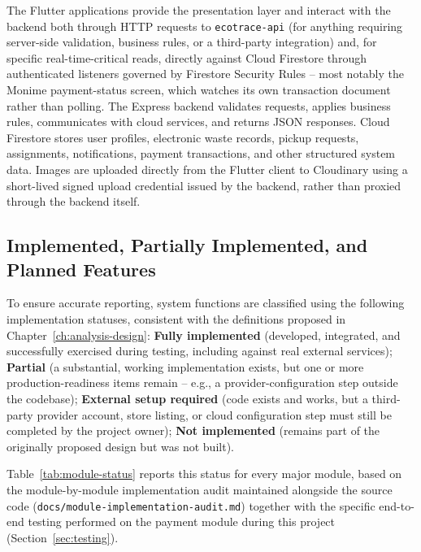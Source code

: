 The Flutter applications provide the presentation layer and interact with
the backend both through HTTP requests to \texttt{ecotrace-api} (for
anything requiring server-side validation, business rules, or a third-party
integration) and, for specific real-time-critical reads, directly against Cloud
Firestore through authenticated listeners governed by Firestore Security
Rules -- most notably the Monime payment-status screen, which watches its
own transaction document rather than polling. The Express backend validates
requests, applies business rules, communicates with cloud services, and
returns JSON responses. Cloud Firestore stores user profiles, electronic waste
records, pickup requests, assignments, notifications, payment transactions,
and other structured system data. Images are uploaded directly from the
Flutter client to Cloudinary using a short-lived signed upload credential
issued by the backend, rather than proxied through the backend itself.

\subsection{Implemented, Partially Implemented, and Planned Features}

To ensure accurate reporting, system functions are classified using the
following implementation statuses, consistent with the definitions proposed in
Chapter~\ref{ch:analysis-design}: \textbf{Fully implemented} (developed,
integrated, and successfully exercised during testing, including against real
external services); \textbf{Partial} (a substantial, working implementation
exists, but one or more production-readiness items remain -- e.g., a
provider-configuration step outside the codebase); \textbf{External setup
required} (code exists and works, but a third-party provider account, store
listing, or cloud configuration step must still be completed by the project
owner); \textbf{Not implemented} (remains part of the originally proposed
design but was not built).

Table~\ref{tab:module-status} reports this status for every major module,
based on the module-by-module implementation audit maintained alongside
the source code (\texttt{docs/module-implementation-audit.md}) together with
the specific end-to-end testing performed on the payment module during this
project (Section~\ref{sec:testing}).

